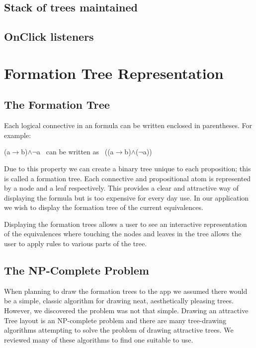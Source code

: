 \documentclass{report}
\begin{document}
\subsection{Stack of trees maintained}
\subsection{OnClick listeners}

\section{Formation Tree Representation}

\subsection{The Formation Tree}

Each logical connective in an formula can be written enclosed in parentheses. For example:

\begin{center}
(a$\to$b)$\land$$\neg$a \ can be written as \ ((a$\to$b)$\land$($\neg$a))
\end{center}

Due to this property we can create a binary tree unique to each proposition; this is called a formation tree. Each connective and propositional atom is represented by a node and a leaf respectively. This provides a clear and attractive way of displaying the formula but is too expensive for every day use. In our application we wish to display the formation tree of the current equivalences.

Displaying the formation trees allows a user to see an interactive representation of the equivalences where touching the nodes and leaves in the tree allows the user to apply rules to various parts of the tree.

\subsection{The NP-Complete Problem}

When planning to draw the formation trees to the app we assumed there would be a simple, classic algorithm for drawing neat, aesthetically pleasing trees. However, we discovered the problem was not that simple. Drawing an attractive Tree layout is an NP-complete problem\cite{npcompletetrees} and there are many tree-drawing algorithms attempting to solve the problem of drawing attractive trees. We reviewed many of these algorithms to find one suitable to use.
\end{document}
